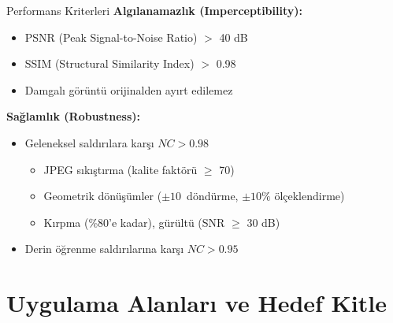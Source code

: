 \documentclass[aspectratio=169,xcolor={dvipsnames}]{beamer}
\begin{document}
\begin{frame}{Performans Kriterleri}
\textbf{Algılanamazlık (Imperceptibility):}
\begin{itemize}
\item PSNR (Peak Signal-to-Noise Ratio) $>$ 40 dB
\item SSIM (Structural Similarity Index) $>$ 0.98
\item Damgalı görüntü orijinalden ayırt edilemez
\end{itemize}

\vspace{0.3cm}

\textbf{Sağlamlık (Robustness):}
\begin{itemize}
\item Geleneksel saldırılara karşı $NC > 0.98$
\begin{itemize}
\item JPEG sıkıştırma (kalite faktörü $\geq$ 70)
\item Geometrik dönüşümler ($\pm 10$\textdegree~döndürme, $\pm 10\%$ ölçeklendirme)
\item Kırpma (\%80'e kadar), gürültü (SNR $\geq$ 30 dB)
\end{itemize}
\item Derin öğrenme saldırılarına karşı $NC > 0.95$
\end{itemize}
\end{frame}



\section{Uygulama Alanları ve Hedef Kitle}
\end{document}
